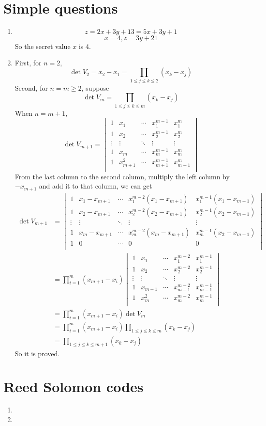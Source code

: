 \documentclass{article}
\begin{document}
\section{Simple questions}
\begin{enumerate}
\item
$$z=2x+3y+13=5x+3y+1$$
$$x=4,z=3y+21$$
So the secret value $x$ is 4.
\item
First, for $n=2$, $$\det V_2=x_2-x_1=\prod_{1\leqslant j\leqslant k\leqslant 2}(x_k-x_j)$$
Second, for $n=m\geqslant 2$, suppose $$\det V_m=\prod_{1\leqslant j\leqslant k\leqslant m}(x_k-x_j)$$
When $n=m+1$, 
$$\det V_{m+1}=
\begin{vmatrix}
1 & x_1 & \cdots & x_1^{m-1} & x_1^m \\
1 & x_2 & \cdots & x_2^{m-1} & x_2^m \\
\vdots & \vdots & \ddots & \vdots & \vdots \\
1 & x_m & \cdots & x_m^{m-1} & x_m^m \\
1 & x_{m+1}^2 & \cdots & x_{m+1}^{m-1} & x_{m+1}^m \\
\end{vmatrix}
$$
From the last column to the second column, multiply the left column by $-x_{m+1}$ and add it to that column, we can get
$$
\begin{aligned}
\det V_{m+1}&=
\begin{vmatrix}
1 & x_1-x_{m+1} & \cdots & x_1^{m-2}(x_1-x_{m+1}) & x_1^{m-1}(x_1-x_{m+1}) \\
1 & x_2-x_{m+1} & \cdots & x_2^{m-2}(x_2-x_{m+1}) & x_2^{m-1}(x_2-x_{m+1}) \\
\vdots & \vdots & \ddots & \vdots & \vdots \\
1 & x_m-x_{m+1} & \cdots & x_m^{m-2}(x_m-x_{m+1}) & x_m^{m-1}(x_2-x_{m+1}) \\
1 & 0 & \cdots & 0 & 0 \\
\end{vmatrix}\\
&=\prod_{i=1}^m(x_{m+1}-x_i)
\begin{vmatrix}
1 & x_1 & \cdots & x_1^{m-2} & x_1^{m-1} \\
1 & x_2 & \cdots & x_2^{m-2} & x_2^{m-1} \\
\vdots & \vdots & \ddots & \vdots & \vdots \\
1 & x_{m-1} & \cdots & x_{m-1}^{m-2} & x_{m-1}^{m-1} \\
1 & x_m^2 & \cdots & x_m^{m-2} & x_m^{m-1} \\
\end{vmatrix}\\
&=\prod_{i=1}^m(x_{m+1}-x_i)\det V_m\\
&=\prod_{i=1}^m(x_{m+1}-x_i)\prod_{1\leqslant j\leqslant k\leqslant m}(x_k-x_j)\\
&=\prod_{1\leqslant j\leqslant k\leqslant m+1}(x_k-x_j)
\end{aligned}
$$
So it is proved.
\end{enumerate}

\section{Reed Solomon codes}
\begin{enumerate}
\item

\item
\end{enumerate}
\end{document}
